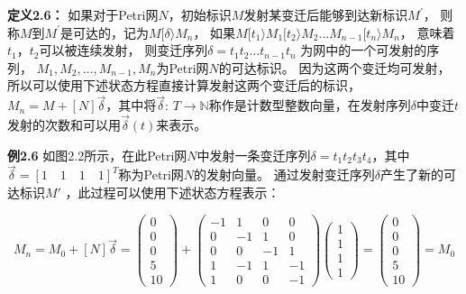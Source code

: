     \textbf{定义2.6}\cite{Liu2013}\textbf{：}
    如果对于Petri网$N$，初始标识$M$发射某变迁后能够到达新标识$M^{\prime}$，
    则称$M$到$M^{\prime}$是可达的，记为$M[\delta\rangle M_{n}$，
    如果$M[t_{1}\rangle M_{1}[t_{2}\rangle M_{2}\ldots M_{n-1}[t_{n}\rangle M_{n}$，
    意味着$t_1$，$t_2$可以被连续发射，
    则变迁序列$\delta=t_{1}t_{2}\dots t_{n-1}t_{n}$ 为网中的一个可发射的序列，
    $M_{1},M_{2},\dots,M_{n-1},M_{n}$为Petri网$N$的可达标识。
    因为这两个变迁均可发射，所以可以使用下述状态方程直接计算发射这两个变迁后的标识，
    $M_{n}=M+[N]\overrightarrow{\delta}$，其中将$\overrightarrow{\delta}$: $T\rightarrow \mathbb{N}$称作是计数型整数向量，在发射序列$\delta$中变迁$t$发射的次数和可以用$\overrightarrow{\delta}(t)$来表示。

    \textbf{例2.6}\hspace{0.5em}
    如图2.2所示，在此Petri网$N$中发射一条变迁序列$\delta=t_1t_2t_3t_4$，其中$\overrightarrow{\delta}= [1 \quad 1 \quad 1 \quad 1]^T$称为Petri网$N$的发射向量。
    通过发射变迁序列$\delta$产生了新的可达标识$M'$ ，此过程可以使用下述状态方程表示：
    
    \begin{equation}\label{equaM}
    M_n=M_0+[N]\overrightarrow{\delta}=\begin{pmatrix}
    0\\
    0\\
    0\\
    5\\
    10
    \end{pmatrix}+\begin{pmatrix}
    -1&1&0&0\\
    0& -1&1&0\\
    0 &0&-1&1\\
    1&-1 &1&-1\\
    1&0&0&-1
    \end{pmatrix}\begin{pmatrix}
    1\\
    1\\
    1\\
    1
    \end{pmatrix}=
    \begin{pmatrix}
    0\\
    0\\
    0\\
    5\\
    10
    \end{pmatrix}=M_0
    \end{equation}
    
